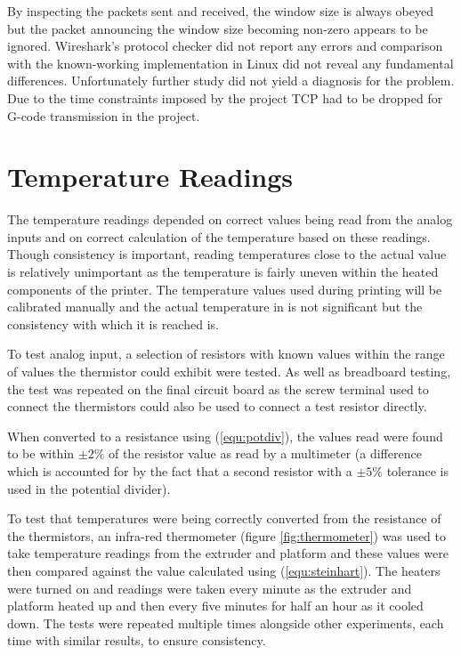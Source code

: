 		By inspecting the packets sent and received, the window size is always
		obeyed but the packet announcing the window size becoming non-zero appears
		to be ignored. Wireshark's protocol checker did not report any errors and
		comparison with the known-working implementation in Linux did not reveal any
		fundamental differences. Unfortunately further study did not yield a
		diagnosis for the problem. Due to the time constraints imposed by the
		project TCP had to be dropped for G-code transmission in the project.
	
	
	\section{Temperature Readings}
		
		The temperature readings depended on correct values being read from the
		analog inputs and on correct calculation of the temperature based on these
		readings. Though consistency is important, reading temperatures close to the
		actual value is relatively unimportant as the temperature is fairly uneven
		within the heated components of the printer. The temperature values used
		during printing will be calibrated manually and the actual temperature in
		\dC{} is not significant but the consistency with which it is reached is.
		
		To test analog input, a selection of resistors with known values within the
		range of values the thermistor could exhibit were tested. As well as
		breadboard testing, the test was repeated on the final circuit board as the
		screw terminal used to connect the thermistors could also be used to connect
		a test resistor directly.
		
		When converted to a resistance using (\ref{equ:potdiv}), the values read
		were found to be within $\pm2\%$ of the resistor value as read by a
		multimeter (a difference which is accounted for by the fact that a second
		resistor with a $\pm5\%$ tolerance is used in the potential divider).
		
		To test that temperatures were being correctly converted from the resistance
		of the thermistors, an infra-red thermometer (figure \ref{fig:thermometer})
		was used to take temperature readings from the extruder and platform and
		these values were then compared against the value calculated using
		(\ref{equ:steinhart}). The heaters were turned on and readings were taken
		every minute as the extruder and platform heated up and then every five
		minutes for half an hour as it cooled down. The tests were repeated multiple
		times alongside other experiments, each time with similar results, to ensure
		consistency.
		
